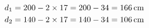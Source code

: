 \documentclass[preview]{standalone}
\begin{document}
\begin{align*}
\special{dvisvgm:raw <g id='unique000'>}d_1 &= 200 - 2\times 17 = 200 - 34 = 166\,\text{cm} \\ \special{dvisvgm:raw </g>}\special{dvisvgm:raw <g id='unique001'>}d_2 &= 140 - 2\times 17 = 140 - 34 = 106\,\text{cm}\special{dvisvgm:raw </g>}
\end{align*}
\end{document}
